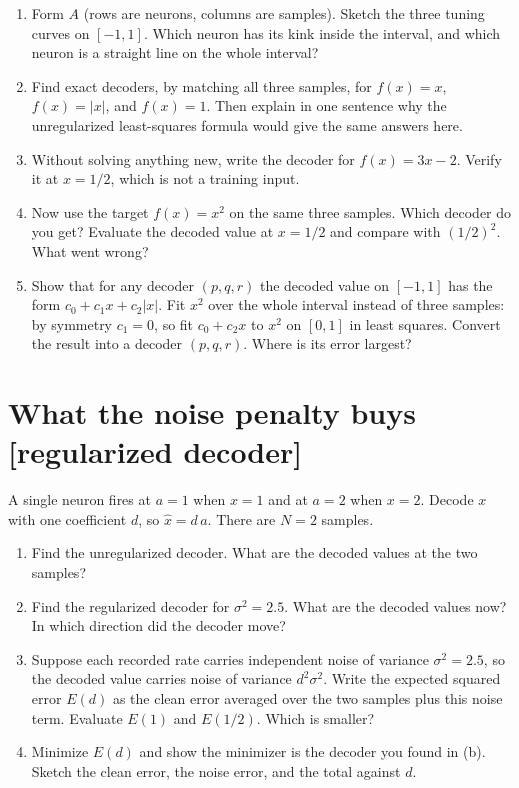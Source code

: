 \documentclass[11pt,letterpaper]{article}
\begin{document}
\begin{enumerate}
\item Form $A$ (rows are neurons, columns are samples). Sketch the three tuning curves on $[-1, 1]$. Which neuron has its kink inside the interval, and which neuron is a straight line on the whole interval?
\item Find exact decoders, by matching all three samples, for $f(x) = x$, \ $f(x) = |x|$, and $f(x) = 1$. Then explain in one sentence why the unregularized least-squares formula would give the same answers here.
\item Without solving anything new, write the decoder for $f(x) = 3x - 2$. Verify it at $x = 1/2$, which is not a training input.
\item Now use the target $f(x) = x^2$ on the same three samples. Which decoder do you get? Evaluate the decoded value at $x = 1/2$ and compare with $(1/2)^2$. What went wrong?
\item Show that for any decoder $(p, q, r)$ the decoded value on $[-1, 1]$ has the form $c_0 + c_1 x + c_2 |x|$. Fit $x^2$ over the whole interval instead of three samples: by symmetry $c_1 = 0$, so fit $c_0 + c_2 x$ to $x^2$ on $[0, 1]$ in least squares. Convert the result into a decoder $(p, q, r)$. Where is its error largest?
\end{enumerate}

\section{What the noise penalty buys \hfill [regularized decoder]}

A single neuron fires at $a = 1$ when $x = 1$ and at $a = 2$ when $x = 2$. Decode $x$ with one coefficient $d$, so $\hat x = d\,a$. There are $N = 2$ samples.

\begin{enumerate}
\item Find the unregularized decoder. What are the decoded values at the two samples?
\item Find the regularized decoder for $\sigma^2 = 2.5$. What are the decoded values now? In which direction did the decoder move?
\item Suppose each recorded rate carries independent noise of variance $\sigma^2 = 2.5$, so the decoded value carries noise of variance $d^2\sigma^2$. Write the expected squared error $E(d)$ as the clean error averaged over the two samples plus this noise term. Evaluate $E(1)$ and $E(1/2)$. Which is smaller?
\item Minimize $E(d)$ and show the minimizer is the decoder you found in (b). Sketch the clean error, the noise error, and the total against $d$.
\end{enumerate}
\end{document}
